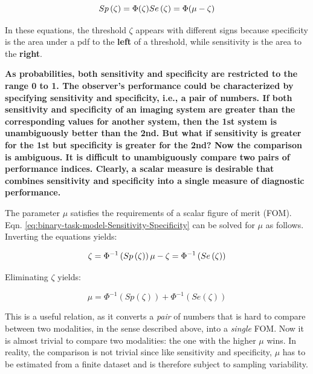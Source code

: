 \documentclass[
]{book}
\begin{document}
\begin{equation} 
Sp\left ( \zeta \right ) = \Phi(\zeta)\\
Se\left ( \zeta \right ) = \Phi(\mu-\zeta)
\label{eq:binary-task-model-Sensitivity-Specificity}
\end{equation}

In these equations, the threshold \(\zeta\) appears with different signs because specificity is the area under a pdf to the \textbf{left} of a threshold, while sensitivity is the area to the \textbf{right}.

\textbf{As probabilities, both sensitivity and specificity are restricted to the range 0 to 1. The observer's performance could be characterized by specifying sensitivity and specificity, i.e., a pair of numbers. If both sensitivity and specificity of an imaging system are greater than the corresponding values for another system, then the 1st system is unambiguously better than the 2nd. But what if sensitivity is greater for the 1st but specificity is greater for the 2nd? Now the comparison is ambiguous. It is difficult to unambiguously compare two pairs of performance indices. Clearly, a scalar measure is desirable that combines sensitivity and specificity into a single measure of diagnostic performance.}

The parameter \(\mu\) satisfies the requirements of a scalar figure of merit (FOM). Eqn. \eqref{eq:binary-task-model-Sensitivity-Specificity} can be solved for \(\mu\) as follows. Inverting the equations yields:

\begin{equation} 
\zeta =\Phi^{-1} \left (Sp\left ( \zeta \right )  \right )\\
\mu - \zeta = \Phi^{-1} \left (Se\left ( \zeta \right )  \right )
\label{eq:binary-task-model-solve-mu-zeta}
\end{equation}

Eliminating \(\zeta\) yields:

\begin{equation} 
\mu = \Phi^{-1} \left (Sp\left ( \zeta \right )  \right ) + \Phi^{-1} \left (Se\left ( \zeta \right )  \right )
\label{eq:binary-task-model-solve-mu}
\end{equation}

This is a useful relation, as it converts a \emph{pair} of numbers that is hard to compare between two modalities, in the sense described above, into a \emph{single} FOM. Now it is almost trivial to compare two modalities: the one with the higher \(\mu\) wins. In reality, the comparison is not trivial since like sensitivity and specificity, \(\mu\) has to be estimated from a finite dataset and is therefore subject to sampling variability.
\end{document}
